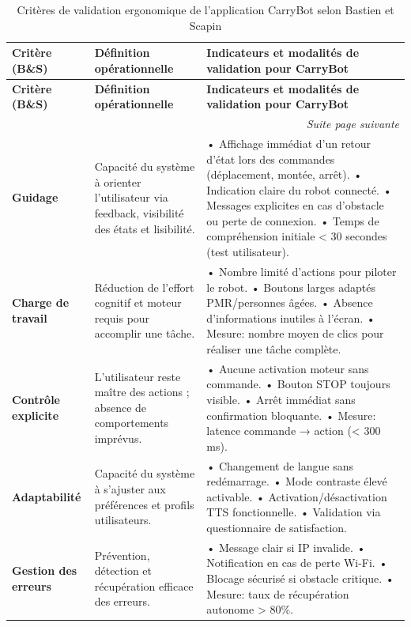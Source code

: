 \documentclass[12pt,a4paper]{article}
\begin{document}
\begin{longtable}{|p{3.2cm}|p{4.3cm}|p{6.8cm}|}
\caption{Critères de validation ergonomique de l’application CarryBot selon Bastien et Scapin} \\
\hline
\rowcolor{gray!20}
\textbf{Critère (B\&S)} & \textbf{Définition opérationnelle} & \textbf{Indicateurs et modalités de validation pour CarryBot} \\
\hline
\endfirsthead

\hline
\rowcolor{gray!20}
\textbf{Critère (B\&S)} & \textbf{Définition opérationnelle} & \textbf{Indicateurs et modalités de validation pour CarryBot} \\
\hline
\endhead

\hline
\multicolumn{3}{r}{\textit{Suite page suivante}} \\
\endfoot

\hline
\endlastfoot

\textbf{Guidage} &
Capacité du système à orienter l’utilisateur via feedback, visibilité des états et lisibilité. &
• Affichage immédiat d’un retour d’état lors des commandes (déplacement, montée, arrêt).  
• Indication claire du robot connecté.  
• Messages explicites en cas d’obstacle ou perte de connexion.  
• Temps de compréhension initiale < 30 secondes (test utilisateur). \\
\hline

\textbf{Charge de travail} &
Réduction de l’effort cognitif et moteur requis pour accomplir une tâche. &
• Nombre limité d’actions pour piloter le robot.  
• Boutons larges adaptés PMR/personnes âgées.  
• Absence d’informations inutiles à l’écran.  
• Mesure: nombre moyen de clics pour réaliser une tâche complète. \\
\hline

\textbf{Contrôle explicite} &
L’utilisateur reste maître des actions ; absence de comportements imprévus. &
• Aucune activation moteur sans commande.  
• Bouton STOP toujours visible.  
• Arrêt immédiat sans confirmation bloquante.  
• Mesure: latence commande → action (< 300 ms). \\
\hline

\textbf{Adaptabilité} &
Capacité du système à s’ajuster aux préférences et profils utilisateurs. &
• Changement de langue sans redémarrage.  
• Mode contraste élevé activable.  
• Activation/désactivation TTS fonctionnelle.  
• Validation via questionnaire de satisfaction. \\
\hline

\textbf{Gestion des erreurs} &
Prévention, détection et récupération efficace des erreurs. &
• Message clair si IP invalide.  
• Notification en cas de perte Wi-Fi.  
• Blocage sécurisé si obstacle critique.  
• Mesure: taux de récupération autonome > 80\%. \\
\hline


\end{longtable}
\end{document}
